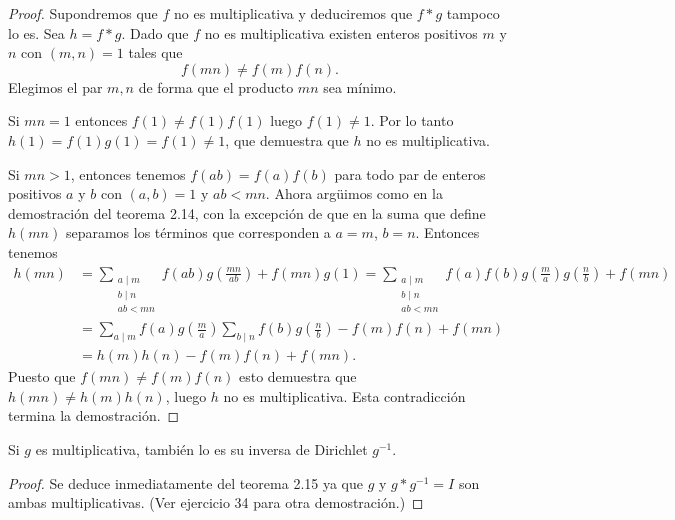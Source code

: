 \documentclass[12pt,a4paper]{book}
\begin{document}
    \begin{proof}
        Supondremos que $f$ no es multiplicativa y deduciremos que $f*g$ tampoco lo es.
        Sea $h=f*g$. Dado que $f$ no es multiplicativa existen enteros positivos $m$ y $n$
        con $(m,n)=1$ tales que
        \begin{equation*}
            f(mn)\neq f(m)f(n).
        \end{equation*}
        Elegimos el par $m,n$ de forma que el producto $mn$ sea mínimo.

        Si $mn=1$ entonces $f(1)\neq f(1)f(1)$ luego $f(1)\neq1$. Por lo tanto
        $h(1)=f(1)g(1)=f(1)\neq1$, que demuestra que $h$ no es multiplicativa.

        Si $mn>1$, entonces tenemos $f(ab)=f(a)f(b)$ para todo par de enteros positivos $a$
        y $b$ con $(a,b)=1$ y $ab<mn$. Ahora argüimos como en la demostración del teorema
        2.14, con la excepción de que en la suma que define $h(mn)$ separamos los términos
        que corresponden a $a=m$, $b=n$. Entonces tenemos
        \begin{align*}
            h(mn)&=\sum_{\substack{a\mid m\\ b\mid n\\ ab<mn}}f(ab)g\left(\frac{mn}{ab}\right)
            +f(mn)g(1)
            =\sum_{\substack{a\mid m\\ b\mid n\\ ab<mn}}f(a)f(b)g\left(\frac{m}{a}\right)g\left(\frac{n}{b}\right)+f(mn)\\
            &=\sum_{a\mid m}f(a)g\left(\frac{m}{a}\right)\sum_{b\mid n}f(b)g\left(\frac{n}{b}\right)-f(m)f(n)+f(mn)\\
            &=h(m)h(n)-f(m)f(n)+f(mn).
        \end{align*}
        Puesto que $f(mn)\neq f(m)f(n)$ esto demuestra que $h(mn)\neq h(m)h(n)$, luego $h$
        no es multiplicativa. Esta contradicción termina la demostración.
    \end{proof}

    \begin{teorema}
        Si $g$ es multiplicativa, también lo es su inversa de Dirichlet $g^{-1}$.
    \end{teorema}

    \begin{proof}
        Se deduce inmediatamente del teorema 2.15 ya que $g$ y $g*g^{-1}=I$ son ambas
        multiplicativas. (Ver ejercicio 34 para otra demostración.)
    \end{proof}
\end{document}
